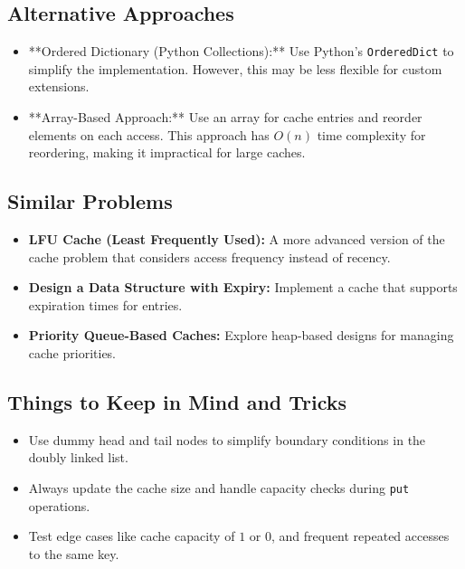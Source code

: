 \subsection*{Alternative Approaches}
\begin{itemize}
    \item **Ordered Dictionary (Python Collections):** Use Python’s \texttt{OrderedDict} to simplify the implementation. However, this may be less flexible for custom extensions.
    \item **Array-Based Approach:** Use an array for cache entries and reorder elements on each access. This approach has \(O(n)\) time complexity for reordering, making it impractical for large caches.
\end{itemize}

\subsection*{Similar Problems}
\begin{itemize}
    \item \textbf{LFU Cache (Least Frequently Used):} A more advanced version of the cache problem that considers access frequency instead of recency.
    \item \textbf{Design a Data Structure with Expiry:} Implement a cache that supports expiration times for entries.
    \item \textbf{Priority Queue-Based Caches:} Explore heap-based designs for managing cache priorities.
\end{itemize}

\subsection*{Things to Keep in Mind and Tricks}
\begin{itemize}
    \item Use dummy head and tail nodes to simplify boundary conditions in the doubly linked list.
    \item Always update the cache size and handle capacity checks during \texttt{put} operations.
    \item Test edge cases like cache capacity of \(1\) or \(0\), and frequent repeated accesses to the same key.
\end{itemize}

